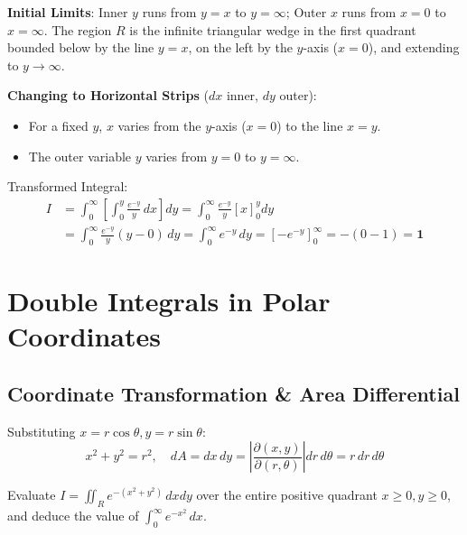 \begin{solutionbox}
\textbf{Initial Limits}: Inner $y$ runs from $y = x$ to $y = \infty$; Outer $x$ runs from $x = 0$ to $x = \infty$.
The region $R$ is the infinite triangular wedge in the first quadrant bounded below by the line $y = x$, on the left by the $y$-axis ($x = 0$), and extending to $y \to \infty$.

\textbf{Changing to Horizontal Strips} ($dx$ inner, $dy$ outer):
\begin{itemize}
    \item For a fixed $y$, $x$ varies from the $y$-axis ($x = 0$) to the line $x = y$.
    \item The outer variable $y$ varies from $y = 0$ to $y = \infty$.
\end{itemize}
Transformed Integral:
\begin{align*}
    I &= \int_0^\infty \left[ \int_0^y \frac{e^{-y}}{y}\,dx \right] dy = \int_0^\infty \frac{e^{-y}}{y} \left[ x \right]_0^y dy \\
    &= \int_0^\infty \frac{e^{-y}}{y} (y - 0)\,dy = \int_0^\infty e^{-y}\,dy = \left[ -e^{-y} \right]_0^\infty = -(0 - 1) = \mathbf{1}
\end{align*}
\end{solutionbox}

\section{Double Integrals in Polar Coordinates}

\subsection{Coordinate Transformation \& Area Differential}

\begin{theorem}
Substituting $x = r\cos\theta, y = r\sin\theta$:
\begin{equation}
    x^2 + y^2 = r^2, \quad dA = dx\,dy = \left| \frac{\partial(x,y)}{\partial(r,\theta)} \right| dr\,d\theta = r\,dr\,d\theta
\end{equation}
\end{theorem}

\begin{example}
Evaluate $I = \iint_R e^{-(x^2+y^2)}\,dx dy$ over the entire positive quadrant $x \ge 0, y \ge 0$, and deduce the value of $\int_0^\infty e^{-x^2}\,dx$.
\end{example}


